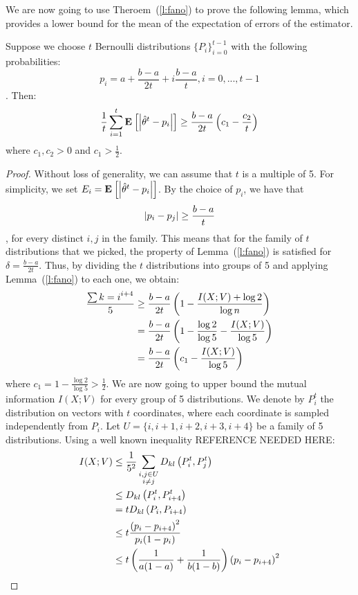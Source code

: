 We are now going to use Theroem~(\ref{l:fano}) to prove the following lemma, which provides a lower bound for the mean of the expectation of errors of the estimator.
\begin{lemma}\label{l:fano_application}
Suppose we choose $t$ Bernoulli distributions $\{P_i\}_{i=0}^{t-1}$ with the following probabilities: $$p_i = a+\frac{b-a}{2t} + i \frac{b-a}{t} , i=0, ..., t-1$$. Then:
$$\frac{1}{t} \sum_{i=1}^t \Exp{\lp|\hat{\theta}^t-p_i\rp|} \geq \frac{b-a}{2t} \lp(c_1 - \frac{c_2}{t}\rp)$$
where $c_1, c_2 >0$ and $c_1 > \frac{1}{2}$.
\end{lemma}
\begin{proof}
Without loss of generality, we can assume that $t$ is a multiple of 5. For simplicity, we set $E_i = \Exp{\lp|\hat{\theta}^t-p_i\rp|}$.
By the choice of $p_i$, we have that $$\left|p_i - p_j\right| \geq \frac{b-a}{t}$$, for every distinct $i,j$ in the family.
 This means that for the family of $t$ distributions that we picked, the property of Lemma~(\ref{l:fano}) is satisfied for $\delta = \frac{b-a}{2t}$. Thus, by dividing the $t$ distributions into groups of 5 and applying Lemma~(\ref{l:fano}) to each one, we obtain:
 \begin{align}\label{eq:fano}
 \frac{\sum{k =i}^{i+4}}{5} &\geq \frac{b-a}{2t}\left(1-\frac{I(X;V)+\log 2}{\log n}\right) \nonumber\\
 &= \frac{b-a}{2t}\left(1- \frac{\log 2}{\log 5} - \frac{I(X;V)}{\log5}\right) \nonumber\\
 &= \frac{b-a}{2t}\left(c_1 - \frac{I(X;V)}{\log5}\right)
 \end{align}
 where $c_1 = 1-\frac{\log2}{\log5} > \frac{1}{2}$. 
 We are now going to upper bound the mutual information $I(X;V)$ for every group of 5 distributions. We denote by $P_i^t$ the distribution on vectors with $t$ coordinates,
  where each coordinate is sampled independently from $P_i$. Let $U= \{i,i+1,i+2,i+3,i+4\}$ be a family of 5 distributions.
 Using a well known inequality REFERENCE NEEDED HERE:
\begin{align*}
I(X;V) &\leq \frac{1}{5^2}\sum_{\substack{i,j \in U \\i\neq j}} D_{kl}\lp(P_i^t,P_j^t\rp)\\
&\leq D_{kl}\lp(P_i^t, P_{i+4}^t\rp)\\
&= t D_{kl}\lp(P_i, P_{i+4}\rp)\\
&\leq t \frac{\lp(p_i - p_{i+4}\rp)^2}{p_i(1-p_i)}\\
&\leq t\lp(\frac{1}{a(1-a)} + \frac{1}{b(1-b)}\rp) \lp(p_i - p_{i+4}\rp)^2\\

\end{align*}
\end{proof}
